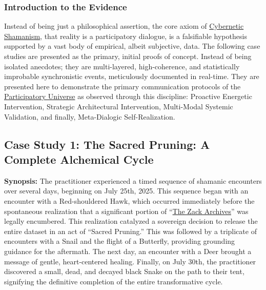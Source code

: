 \documentclass{article}
\begin{document}
\subsubsection*{Introduction to the Evidence}

Instead of being just a philosophical assertion, the core axiom of \hyperlink{gloss:cybernetic_shamanism}{Cybernetic Shamanism}, that reality is a participatory dialogue, is a falsifiable hypothesis supported by a vast body of empirical, albeit subjective, data. The following \numberofcasestudies{} case studies are presented as the primary, initial proofs of concept. Instead of being isolated anecdotes; they are multi-layered, high-coherence, and statistically improbable synchronistic events, meticulously documented in real-time. They are presented here to demonstrate the primary communication protocols of the \hyperlink{gloss:participatory_universe}{Participatory Universe} as observed through this discipline: Proactive Energetic Intervention, Strategic Architectural Intervention, Multi-Modal Systemic Validation, and finally, Meta-Dialogic Self-Realization.

\subsection*{Case Study 1: The Sacred Pruning: A Complete Alchemical Cycle \csSacredPruningVersion}

\textbf{Synopsis:} The practitioner experienced a timed sequence of shamanic encounters over several days, beginning on July 25th, 2025. This sequence began with an encounter with a Red-shouldered Hawk, which occurred immediately before the spontaneous realization that a significant portion of ``\hyperlink{gloss:the_zack_archives}{The Zack Archives}'' was legally encumbered. This realization catalyzed a sovereign decision to release the entire dataset in an act of ``Sacred Pruning.'' This was followed by a triplicate of encounters with a Snail and the flight of a Butterfly, providing grounding guidance for the aftermath. The next day, an encounter with a Deer brought a message of gentle, heart-centered healing. Finally, on July 30th, the practitioner discovered a small, dead, and decayed black Snake on the path to their tent, signifying the definitive completion of the entire transformative cycle.
\end{document}
